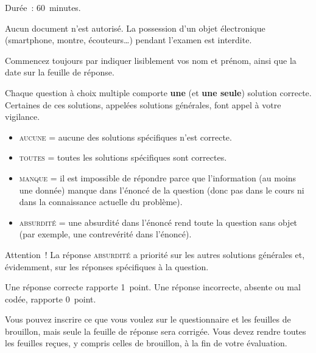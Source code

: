 \documentclass[11pt,french,a4paper,twoside]{article}
\newcommand{\thesubtitle}{Examen blanc du \thedate{}}
\begin{document}
\begin{examcopy}[2]
  \setcounter{figure}{0}
  \noindent{\bf \thetitle{} \hfill{} \thesubtitle{}}

  \vspace{2ex}

  Durée~: 60~minutes.

  Aucun document n'est autorisé.
  La possession d'un objet électronique (smartphone, montre, écouteurs\ldots{}) pendant l'examen est interdite.

  Commencez toujours par indiquer lisiblement vos nom et prénom, ainsi que la date sur la feuille de réponse.

  Chaque question à choix multiple comporte \textbf{une} (et \textbf{une seule}) solution correcte.
  Certaines de ces solutions, appelées solutions générales, font appel à votre vigilance.
  \begin{itemize}
    \item \textsc{aucune} = aucune des solutions spécifiques n'est correcte.
    \item \textsc{toutes} = toutes les solutions spécifiques sont correctes.
    \item \textsc{manque} = il est impossible de répondre parce que l'information (au moins une donnée) manque dans l'énoncé de la question (donc pas dans le cours ni dans la connaissance actuelle du problème).
    \item \textsc{absurdité} = une absurdité dans l'énoncé rend toute la question sans objet (par exemple, une contrevérité dans l'énoncé).
  \end{itemize}
  Attention~! La réponse \textsc{absurdité} a priorité sur les autres solutions générales et, évidemment, sur les réponses spécifiques à la question.

  Une réponse correcte rapporte 1~point.
  Une réponse incorrecte, absente ou mal codée, rapporte 0~point.

  Vous pouvez inscrire ce que vous voulez sur le questionnaire et les feuilles de brouillon, mais seule la feuille de réponse sera corrigée.
  Vous devez rendre toutes les feuilles reçues, y compris celles de brouillon, à la fin de votre évaluation.

  \noindent{\hrulefill{}}

  \vspace{2ex}





\end{examcopy}
\end{document}
